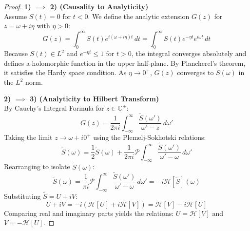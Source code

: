 \documentclass[a4paper,11pt]{article}
\theoremstyle{definition}
\begin{document}
\begin{proof}
\textbf{1) $\implies$ 2) (Causality to Analyticity)} \\
Assume $S(t) = 0$ for $t < 0$. We define the analytic extension $G(z)$ for $z = \omega + i\eta$ with $\eta > 0$:
\begin{equation}
    G(z) = \int_{0}^{\infty} S(t) e^{i(\omega + i\eta)t} \, dt = \int_{0}^{\infty} S(t) e^{-\eta t} e^{i\omega t} \, dt
\end{equation}
Because $S(t) \in L^2$ and $e^{-\eta t} \le 1$ for $t > 0$, the integral converges absolutely and defines a holomorphic function in the upper half-plane. By Plancherel's theorem, it satisfies the Hardy space condition. As $\eta \to 0^+$, $G(z)$ converges to $\tilde{S}(\omega)$ in the $L^2$ norm.

\vspace{0.5cm}
\textbf{2) $\implies$ 3) (Analyticity to Hilbert Transform)} \\
By Cauchy's Integral Formula for $z \in \mathbb{C}^+$:
\begin{equation}
    G(z) = \frac{1}{2\pi i} \int_{-\infty}^{\infty} \frac{\tilde{S}(\omega')}{\omega' - z} \, d\omega'
\end{equation}
Taking the limit $z \to \omega + i0^+$ using the Plemelj-Sokhotski relations:
\begin{equation}
    \tilde{S}(\omega) = \frac{1}{2}\tilde{S}(\omega) + \frac{1}{2\pi i} \mathcal{P} \int_{-\infty}^{\infty} \frac{\tilde{S}(\omega')}{\omega' - \omega} \, d\omega'
\end{equation}
Rearranging to isolate $\tilde{S}(\omega)$:
\begin{equation}\label{contourint}
    \tilde{S}(\omega) = \frac{1}{\pi i} \mathcal{P} \int_{-\infty}^{\infty} \frac{\tilde{S}(\omega')}{\omega' - \omega} \, d\omega' = -i \mathcal{H}[\tilde{S}](\omega)
\end{equation}
Substituting $\tilde{S} = U + iV$:
\begin{equation}
    U + iV = -i (\mathcal{H}[U] + i\mathcal{H}[V]) = \mathcal{H}[V] - i\mathcal{H}[U]
\end{equation}
Comparing real and imaginary parts yields the relations: $U = \mathcal{H}[V]$ and $V = -\mathcal{H}[U]$.


\end{proof}
\end{document}

